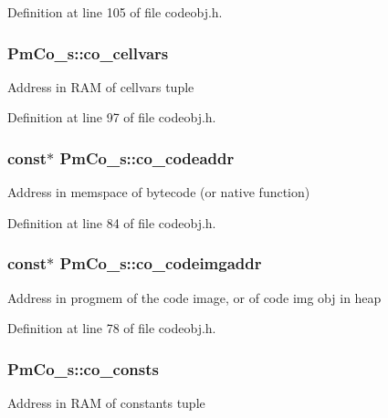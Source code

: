 Definition at line 105 of file codeobj.\-h.

\hypertarget{struct_pm_co__s_a00ea6b3665f02c8e48475b50088a0517}{
\subsubsection[{co\-\_\-cellvars}]{ Pm\-Co\-\_\-s\-::co\-\_\-cellvars}}\label{struct_pm_co__s_a00ea6b3665f02c8e48475b50088a0517}
Address in R\-A\-M of cellvars tuple 

Definition at line 97 of file codeobj.\-h.

\hypertarget{struct_pm_co__s_a73eda27e9c1581fe81761a93ce1a528a}{
\subsubsection[{co\-\_\-codeaddr}]{ {\bf const}$\ast$ Pm\-Co\-\_\-s\-::co\-\_\-codeaddr}}\label{struct_pm_co__s_a73eda27e9c1581fe81761a93ce1a528a}
Address in memspace of bytecode (or native function) 

Definition at line 84 of file codeobj.\-h.

\hypertarget{struct_pm_co__s_a4d55730cf6ba1604503fad4b29473c2f}{
\subsubsection[{co\-\_\-codeimgaddr}]{ {\bf const}$\ast$ Pm\-Co\-\_\-s\-::co\-\_\-codeimgaddr}}\label{struct_pm_co__s_a4d55730cf6ba1604503fad4b29473c2f}
Address in progmem of the code image, or of code img obj in heap 

Definition at line 78 of file codeobj.\-h.

\hypertarget{struct_pm_co__s_a94601e99b78372bfd72227c6b975726b}{
\subsubsection[{co\-\_\-consts}]{ Pm\-Co\-\_\-s\-::co\-\_\-consts}}\label{struct_pm_co__s_a94601e99b78372bfd72227c6b975726b}
Address in R\-A\-M of constants tuple 

